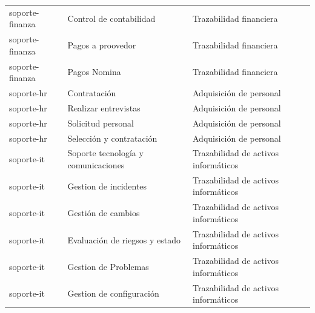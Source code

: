 \documentclass[11pt]{article}
\begin{document}
\begin{longtable}[c]{  | m{2.5cm} | m{2.5cm}| m{4cm} |}
  soporte-finanza&               Control de contabilidad             &  Trazabilidad financiera                                 \\
  soporte-finanza&               Pagos a proovedor                   &  Trazabilidad financiera                                 \\
  soporte-finanza&               Pagos Nomina                        &  Trazabilidad financiera                                 \\
  soporte-hr     &               Contratación                       &   Adquisición de personal                                \\
  soporte-hr     &               Realizar entrevistas                &      Adquisición de personal                                 \\
  soporte-hr     &               Solicitud personal                  &     Adquisición de personal                                  \\
  soporte-hr     &               Selección y contratación          &       Adquisición de personal                                \\
  soporte-it     &               Soporte tecnología y comunicaciones&       Trazabilidad de activos informáticos                           \\
  soporte-it     &               Gestion de incidentes               &     Trazabilidad de activos informáticos                              \\
  soporte-it     &               Gestión de cambios                 &         Trazabilidad de activos informáticos                          \\
  soporte-it     &               Evaluación de riegsos y estado     &        Trazabilidad de activos informáticos                           \\
  soporte-it     &               Gestion de Problemas                &     Trazabilidad de activos informáticos                              \\
  soporte-it     &               Gestion de configuración           &      Trazabilidad de activos informáticos                             \\
  \hline
 
\end{longtable}
  
\end{document}
